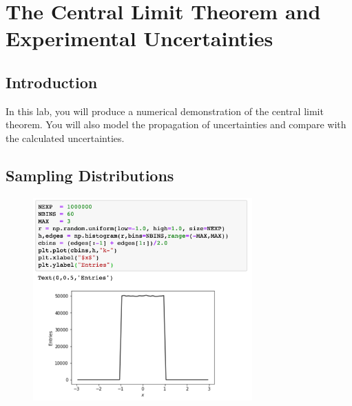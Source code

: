 \chapter{The Central Limit Theorem and Experimental Uncertainties}

%
%

\section{Introduction}

In this lab, you will produce a numerical demonstration of the central
limit theorem.  You will also model the propagation of uncertainties
and compare with the calculated uncertainties.


\section{Sampling Distributions}

\begin{figure}[htbp]
\begin{center}
\includegraphics[width=0.75\textwidth]{figs/uncertainties/step.png}\\
\end{center}
\caption{\label{fig:samplingstep}}
\end{figure}


